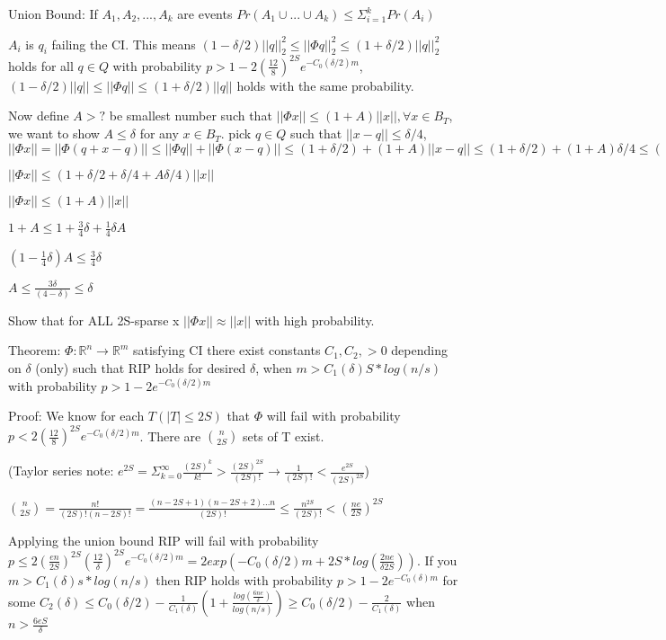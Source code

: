 \documentclass[12pt,letterpaper]{report}
\begin{document}
Union Bound: If $A_1, A_2, ..., A_k$ are events $Pr(A_1 \cup ... \cup A_k) \leq \Sigma_{i=1}^k Pr(A_i)$

$A_i$ is $q_i$ failing the CI.  This means $(1-\delta/2)||q||_2^2 \leq ||\Phi q||_2^2 \leq (1+\delta/2)||q||_2^2$ holds for all $q \in Q$ with probability $ p > 1 - 2(\frac{12}{8})^{2S}e^{-C_0(\delta/2)m}$, $(1-\delta/2)||q|| \leq ||\Phi q|| \leq (1+\delta/2)||q||$ holds with the same probability.

Now define $A > ?$ be smallest number such that $||\Phi x|| \leq (1+A)||x||, \forall x \in B_T$, we want to show $A \leq \delta$ for any $x \in B_T$. pick $q \in Q$ such that $||x - q|| \leq \delta/4$, $||\Phi x|| = ||\Phi (q + x - q)|| \leq ||\Phi q|| + ||\Phi(x-q)|| \leq (1 + \delta/2) + (1 + A)||x-q|| \leq (1 + \delta/2) + (1+A) \delta/4 \leq ((1 + \delta/2) + (1+A) \delta/4)||x||$

$||\Phi x|| \leq (1 + \delta/2 + \delta/4 + A \delta/4)||x||$

$||\Phi x|| \leq (1 + A)||x||$


$1+A \leq 1 + \frac{3}{4} \delta + \frac{1}{4} \delta A$

$(1 - \frac{1}{4} \delta) A \leq \frac{3}{4} \delta $

$A \leq \frac{3\delta}{(4-\delta)} \leq \delta$


Show that for ALL 2S-sparse x $||\Phi x|| \approx ||x||$ with high probability.

Theorem: $\Phi : \mathbb{R}^n \rightarrow \mathbb{R}^m$ satisfying CI there exist constants $C_1, C_2, > 0$ depending on $\delta$ (only) such that RIP holds for desired $\delta$, when $m > C_1(\delta) S * log(n/s)$ with probability $p > 1 - 2e^{-C_0(\delta/2)m}$

Proof: We know for each $T(|T| \leq 2S)$ that $\Phi$ will fail with probability $p < 2(\frac{12}{8})^{2S}e^{-C_0(\delta/2)m}$.  There are ${n \choose 2S}$ sets of T exist.

(Taylor series note: $e^{2S} = \Sigma_{k=0}^\infty \frac{(2S)^k}{k!} > \frac{(2S)^{2S}}{(2S)!} \rightarrow \frac{1}{(2S)!} < \frac{e^{2S}}{(2S)^{2S}}$)

${n \choose 2S} = \frac{n!}{(2S)!(n-2S)!} = \frac{(n-2S+1)(n-2S+2)...n}{(2S)!} \leq \frac{n^{2S}}{(2S)!} < (\frac{n e}{2S})^{2S}$


Applying the union bound RIP will fail with probability $p \leq 2(\frac{en}{2S})^{2S}(\frac{12}{\delta})^{2S}e^{-C_0(\delta/2)m} = 2 exp(-C_0(\delta/2)m + 2S*log(\frac{2ne}{\delta 2 S}))$.  If you $m > C_1(\delta)s*log(n/s)$ then RIP holds with probability $p > 1 - 2 e^{-C_0(\delta)m}$ for some $C_2(\delta) \leq C_0(\delta/2) - \frac{1}{C_1(\delta)}( 1 + \frac{log(\frac{6ne}{\delta})}{log(n/s)}) \geq C_0(\delta/2) - \frac{2}{C_1(\delta)}$ when $n > \frac{6eS}{\delta}$
\end{document}

